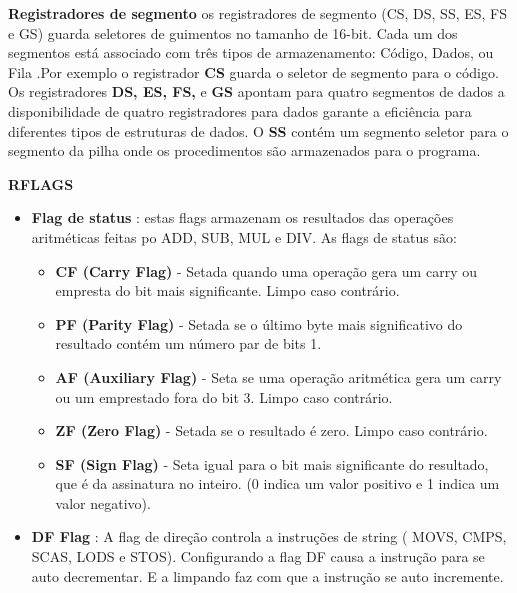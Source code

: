 \documentclass[12pt,a4paper,brazilian,utf8]{ppgsi}
\begin{document}
    \textbf{Registradores de segmento}
    os registradores de segmento (CS, DS, SS, ES, FS e GS) guarda seletores de guimentos no tamanho de 16-bit.
    Cada um dos segmentos está associado com três tipos de armazenamento: Código, Dados, ou Fila .Por exemplo o registrador \textbf{CS} guarda o seletor de segmento para o código.
    Os registradores \textbf{DS, ES, FS,} e \textbf{GS} apontam para quatro segmentos de dados a disponibilidade de quatro registradores para dados garante a eficiência para diferentes tipos de estruturas de dados.
    O \textbf{SS} contém um segmento seletor para o segmento da pilha onde os procedimentos são armazenados para o programa.

    \textbf{RFLAGS} 
    
    \begin{itemize}
        \item \textbf{Flag de status} :  estas flags armazenam os resultados das operações aritméticas feitas po ADD, SUB, MUL e DIV. As flags de status são:
        
        \begin{itemize}
            \item \textbf{CF (Carry Flag)} - Setada quando uma operação gera um carry ou empresta do bit mais significante. Limpo caso contrário.

            \item \textbf{PF (Parity Flag)} - Setada se o último byte mais significativo do resultado contém um número par de bits 1.
            
            \item \textbf{AF (Auxiliary Flag)} - Seta se uma operação aritmética gera um carry ou um emprestado fora do bit 3. Limpo caso contrário.
            		
    		\item \textbf{ZF (Zero Flag)} - Setada se o resultado é zero. Limpo caso contrário.
    
    		\item \textbf{SF (Sign Flag)} - Seta igual para o bit mais significante do resultado, que é da 		assinatura no inteiro. (0 indica um valor positivo e 1 indica um valor negativo).
        \end{itemize}
        
        \item \textbf{DF Flag} : A flag de direção controla a instruções de string ( MOVS, CMPS, SCAS, LODS e STOS). Configurando a flag DF causa a instrução para se auto decrementar. E a limpando faz com que a instrução se auto incremente.



\end{itemize}
\end{document}
